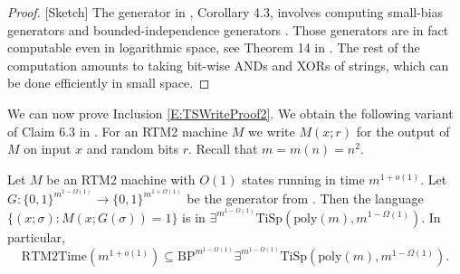 \documentclass{toc}
\newcommand{\zo}{\{0, 1\}}
\newcommand{\poly}{\mathrm{poly}}
\newcommand{\TiSp}[2]{\ensuremath{\mathrm{TiSp} \left(#1,#2 \right)}}
\newcommand{\BP}[1]{\ensuremath{\mathrm{BP}^{#1}}}
\newcommand{\RTMTime}[1]{\ensuremath{\mathrm{RTM2Time} \left( #1 \right)}}
\begin{document}
\begin{proof}
{[}Sketch{]} The generator in \cite{ForbesKelley-2018}, Corollary
4.3, involves computing small-bias generators \cite{NaN93,AGHP92}
and bounded-independence generators \cite{ChG89,ABI86}. Those generators
are in fact computable even in logarithmic space, see Theorem 14 in
\cite{HeV06}. The rest of the computation amounts to taking bit-wise
ANDs and XORs of strings, which can be done efficiently in small space.
\end{proof}
We can now prove Inclusion \eqref{E:TSWriteProof2}. We obtain the
following variant of Claim 6.3 in \cite{ViolaBPvsE}. For an RTM2
machine $M$ we write $M(x;r)$ for the output of $M$ on input $x$
and random bits $r$. Recall that $m=m(n)=n^{2}$.
\begin{claim}
\label{claim:RTM-in-TiSp} Let $M$ be an RTM2 machine with $O(1)$
states running in time $m^{1+o(1)}$. Let $G:\zo^{m^{1-\Omega(1)}}\to\zo^{m^{1+\Omega(1)}}$
be the generator from . Then the language
$\{(x;\sigma):M(x;G(\sigma))=1\}$ is in $\exists^{m^{1-\Omega(1)}}\TiSp{\poly(m)}{m^{1-\Omega(1)}}$.
In particular,
\[
\RTMTime{m^{1+o(1)}}\subseteq\BP{m^{1-\Omega(1)}}\exists^{m^{1-\Omega(1)}}\TiSp{\poly(m)}{m^{1-\Omega(1)}}.
\]
\end{claim}
\end{document}
